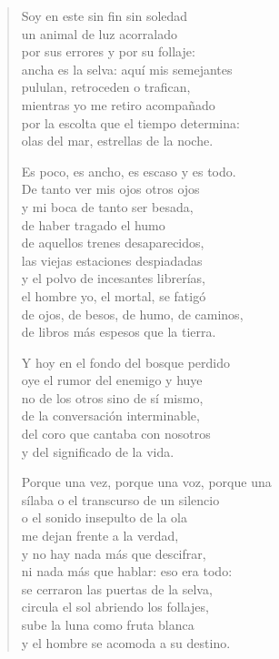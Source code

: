 \documentclass[12pt]{article}
\begin{document}
\clearpage
{}
\begin{verse}

Soy en este sin fin sin soledad\\
un animal de luz acorralado\\
por sus errores y por su follaje:\\
ancha es la selva: aquí mis semejantes\\
pululan, retroceden o trafican,\\
mientras yo me retiro acompañado\\
por la escolta que el tiempo determina:\\
olas del mar, estrellas de la noche.  

Es poco, es ancho, es escaso y es todo.\\
De tanto ver mis ojos otros ojos\\
y mi boca de tanto ser besada,\\
de haber tragado el humo\\
de aquellos trenes desaparecidos,\\
las viejas estaciones despiadadas\\
y el polvo de incesantes librerías,\\
el hombre yo, el mortal, se fatigó\\
de ojos, de besos, de humo, de caminos,\\
de libros más espesos que la tierra.  

Y hoy en el fondo del bosque perdido\\
oye el rumor del enemigo y huye\\
no de los otros sino de sí mismo,\\
de la conversación interminable,\\
del coro que cantaba con nosotros\\
y del significado de la vida.  

Porque una vez, porque una voz, porque una\\
sílaba o el transcurso de un silencio\\
o el sonido insepulto de la ola\\
me dejan frente a la verdad,\\
y no hay nada más que descifrar,\\
ni nada más que hablar: eso era todo:\\
se cerraron las puertas de la selva,\\
circula el sol abriendo los follajes,\\
sube la luna como fruta blanca\\
y el hombre se acomoda a su destino.  

\end{verse}
\end{document}
